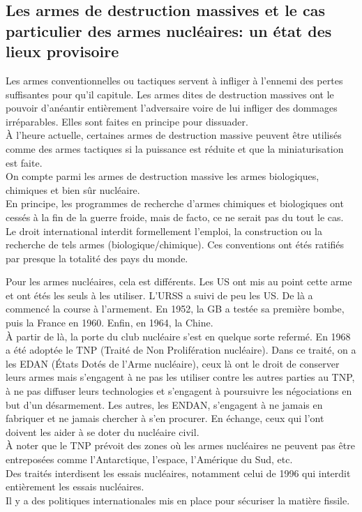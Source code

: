 \documentclass[10pt, a4paper, openany]{book}
\begin{document}
\subsection{Les armes de destruction massives et le cas particulier des armes nucléaires: un état des lieux provisoire}

Les armes conventionnelles ou tactiques servent à infliger à l'ennemi des pertes suffisantes pour qu'il capitule. Les armes dites de destruction massives ont le pouvoir d'anéantir entièrement l'adversaire voire de lui infliger des dommages irréparables. Elles sont faites en principe pour dissuader. \\
À l'heure actuelle, certaines armes de destruction massive peuvent être utilisés comme des armes tactiques si la puissance est réduite et que la miniaturisation est faite. \\
On compte parmi les armes de destruction massive les armes biologiques, chimiques et bien sûr nucléaire. \\
En principe, les programmes de recherche d'armes chimiques et biologiques ont cessés à la fin de la guerre froide, mais de facto, ce ne serait pas du tout le cas. \\
Le droit international interdit formellement l'emploi, la construction ou la recherche de tels armes (biologique/chimique). Ces conventions ont étés ratifiés par presque la totalité des pays du monde. 


Pour les armes nucléaires, cela est différents. Les US ont mis au point cette arme et ont étés les seuls à les utiliser. L'URSS a suivi de peu les US. De là a commencé la course à l'armement. En 1952, la GB a testée sa première bombe, puis la France en 1960. Enfin, en 1964, la Chine. \\
À partir de là, la porte du club nucléaire s'est en quelque sorte refermé. En 1968 a été adoptée le TNP (Traité de Non Prolifération nucléaire). Dans ce traité, on a les EDAN (États Dotés de l'Arme nucléaire), ceux là ont le droit de conserver leurs armes mais s'engagent à ne pas les utiliser contre les autres parties au TNP, à ne pas diffuser leurs technologies et s'engagent à poursuivre les négociations en but d'un désarmement. Les autres, les ENDAN, s'engagent à ne jamais en fabriquer et ne jamais chercher à s'en procurer. En échange, ceux qui l'ont doivent les aider à se doter du nucléaire civil. \\
À noter que le TNP prévoit des zones où les armes nucléaires ne peuvent pas être entreposées comme l'Antarctique, l'espace, l'Amérique du Sud, etc. \\
Des traités interdisent les essais nucléaires, notamment celui de 1996 qui interdit entièrement les essais nucléaires. \\
Il y a des politiques internationales mis en place pour sécuriser la matière fissile. 
\end{document}
